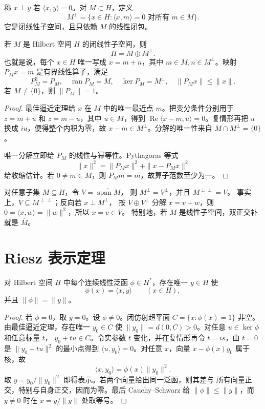 称 \(x\perp y\) 若 \(\langle x,y\rangle=0\)。对 \(M\subset H\)，定义
\[
 M^\perp=\{x\in H:\langle x,m\rangle=0\text{ 对所有 }m\in M\}.
\]
它是闭线性子空间，且只依赖 \(M\) 的线性闭包。

\begin{theorem}[正交投影定理]\label{thm:hilbert-projection}
若 \(M\) 是 Hilbert 空间 \(H\) 的闭线性子空间，则
\[
 H=M\oplus M^\perp.
\]
也就是说，每个 \(x\in H\) 唯一写成 \(x=m+n\)，其中
\(m\in M,n\in M^\perp\)。映射 \(P_Mx=m\) 是有界线性算子，满足
\[
 P_M^2=P_M,\quad \operatorname{ran}P_M=M,\quad
 \ker P_M=M^\perp,\quad \|P_Mx\|\le\|x\|.
\]
若 \(M\ne\{0\}\)，则 \(\|P_M\|=1\)。
\end{theorem}
\begin{proof}
最佳逼近定理给 \(x\) 在 \(M\) 中的唯一最近点 \(m\)。把变分条件分别用于
\(z=m+u\) 和 \(z=m-u\)，其中 \(u\in M\)，得到
\(\operatorname{Re}\langle x-m,u\rangle=0\)。复情形再把 \(u\) 换成
\(iu\)，便得整个内积为零，故 \(x-m\in M^\perp\)。分解的唯一性来自
\(M\cap M^\perp=\{0\}\)。

唯一分解立即给 \(P_M\) 的线性与幂等性。Pythagoras 等式
\[
 \|x\|^2=\|P_Mx\|^2+\|x-P_Mx\|^2
\]
给收缩估计。若 \(0\ne m\in M\)，则 \(P_Mm=m\)，故算子范数至少为一。
\end{proof}

对任意子集 \(M\subseteq H\)，令 \(V=\overline{\operatorname{span}M}\)，
则 \(M^\perp=V^\perp\)，并且 \(M^{\perp\perp}=V\)。
事实上，\(V\subseteq M^{\perp\perp}\)；反向若 \(x\perp M^\perp\)，
按 \(V\oplus V^\perp\) 分解 \(x=v+w\)，则
\(0=\langle x,w\rangle=\|w\|^2\)，所以 \(x=v\in V\)。
特别地，若 \(M\) 是线性子空间，双正交补就是 \(\overline M\)。

\section{Riesz 表示定理}

\begin{theorem}\label{thm:hilbert-riesz}
对 Hilbert 空间 \(H\) 中每个连续线性泛函 \(\phi\in H^*\)，存在唯一
\(y\in H\) 使
\[
 \phi(x)=\langle x,y\rangle\qquad(x\in H),
\]
并且 \(\|\phi\|=\|y\|\)。
\end{theorem}
\begin{proof}
若 \(\phi=0\)，取 \(y=0\)。设 \(\phi\ne0\)。闭仿射超平面
\(C=\{x:\phi(x)=1\}\) 非空。由最佳逼近定理，存在唯一 \(y_0\in C\)
使 \(\|y_0\|=d(0,C)>0\)。对任意 \(u\in\ker\phi\) 和任意标量 \(t\)，
\(y_0+tu\in C\)。令实参数 \(t\) 变化，并在复情形再令 \(t=is\)，由
\(t=0\) 是 \(\|y_0+tu\|^2\) 的最小点得到
\(\langle u,y_0\rangle=0\)。对任意 \(x\)，向量
\(x-\phi(x)y_0\) 属于核，故
\[
 \langle x,y_0\rangle=\phi(x)\|y_0\|^2.
\]
取 \(y=y_0/\|y_0\|^2\) 即得表示。若两个向量给出同一泛函，则其差与
所有向量正交，特别与自身正交，因而为零。最后 Cauchy--Schwarz 给
\(\|\phi\|\le\|y\|\)，而 \(y\ne0\) 时在 \(x=y/\|y\|\) 处取等号。
\end{proof}

